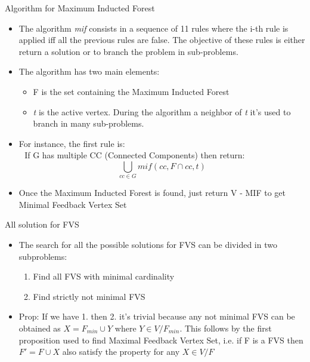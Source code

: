 \documentclass[11pt]{beamer}
\begin{document}
	\begin{frame}{Algorithm for Maximum Inducted Forest}
		\begin{itemize}
			\item The algorithm \textit{mif} consists in a sequence of 11 rules where the i-th rule is applied iff all the previous rules are false. The objective of these rules is either return a solution or to branch the problem in sub-problems.
			\item The algorithm has two main elements:
				\begin{itemize}
					\item F is the set containing the Maximum Inducted Forest
					\item \textit{t} is the active vertex. During the algorithm a neighbor of \textit{t} it's used to branch in many sub-problems.
				\end{itemize}
			\item For instance, the first rule is: \\ \,\, If G has multiple CC (Connected Components) then return: $$ \bigcup_{cc \in G} mif\left(cc, F \cap cc, t \right) $$
			\item Once the Maximum Inducted Forest is found, just return V - MIF to get Minimal Feedback Vertex Set
		\end{itemize}
	\end{frame}
	\begin{frame}{All solution for FVS}
		\begin{itemize}
			\item The search for all the possible solutions for FVS can be divided in two subproblems:
			\begin{enumerate}
				\item Find all FVS with minimal cardinality
				\item Find strictly not minimal FVS 
			\end{enumerate}
			\item  Prop: If we have 1. then 2. it's trivial because any not minimal FVS can be obtained as $ X = F_{min} \cup Y $ where $ Y \in V / F_{min} $. This follows by the first proposition used to find Maximal Feedback Vertex Set, i.e. if F is a FVS then $ F' = F \cup X $ also satisfy the property for any  $ X \in V / F $
		\end{itemize}
	\end{frame}
\end{document}
